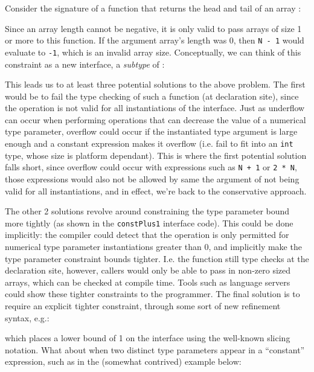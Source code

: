 Consider the signature of a function that returns the head and tail of an array
\autocite{rustConstBlog}:


Since an array length cannot be negative, it is only valid to pass arrays of
size 1 or more to this function. If the argument array's length was 0, then
\texttt{N - 1} would evaluate to \texttt{-1}, which is an invalid array size.
Conceptually, we can think of this constraint as a new interface, a
\emph{subtype} of :


This leads us to at least three potential solutions to the above problem. The
first would be to fail the type checking of such a function (at declaration
site), since the operation is not valid for all instantiations of the 
interface. Just as underflow can occur when performing operations that can
decrease the value of a numerical type parameter, overflow could occur if the
instantiated type argument is large enough and a constant expression makes it
overflow (i.e. fail to fit into an \texttt{int} type, whose size is platform
dependant). This is where the first potential solution falls short, since
overflow could occur with expressions such as \texttt{N + 1} or \texttt{2 * N},
those expressions would also not be allowed by same the argument of not being
valid for all instantiations, and in effect, we're back to the conservative
approach.

The other 2 solutions revolve around constraining the type parameter bound more
tightly (as shown in the \texttt{constPlus1} interface code). This could be done
implicitly: the compiler could detect that the operation is only permitted for
numerical type parameter instantiations greater than 0, and implicitly make the
type parameter constraint bounds tighter. I.e. the function still type checks at
the declaration site, however, callers would only be able to pass in non-zero
sized arrays, which can be checked at compile time. Tools such as language
servers could show these tighter constraints to the programmer. The final
solution is to require an explicit tighter constraint, through some sort of new
refinement syntax, e.g.:


which places a lower bound of 1 on the  interface using the well-known
slicing notation. What about when two distinct type parameters appear in a
``constant'' expression, such as in the (somewhat contrived) example below:

